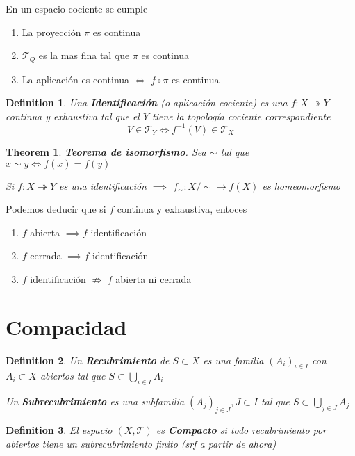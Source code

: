 \documentclass{myclass}
\newtheorem*{definition}{Definition}
\newtheorem*{theorem}{Theorem}
\begin{document}
En un espacio cociente se cumple
\begin{enumerate}[topsep=-6pt, itemsep=0pt]
  \item La proyección $\pi$ es continua
  \item $\mathcal{T}_{Q}$ es la mas fina tal que $\pi$ es continua
  \item La aplicación es continua $\iff$ $f\circ \pi$ es continua
\end{enumerate}

\begin{definition}
Una \textbf{Identificación} (o aplicación cociente) es una $f:X \twoheadrightarrow Y$ continua y exhaustiva tal que el $Y$ tiene la topología cociente correspondiente
\[
V\in \mathcal{T}_Y \iff f^{-1}(V) \in \mathcal{T}_X
\] 
\end{definition}

\begin{theorem}
\textbf{Teorema de isomorfismo}. Sea $\sim $ tal que $x\sim y \iff f(x)=f(y)$

Si $f:X \twoheadrightarrow Y$ es una identificación $\implies$ $f_\sim :X / \sim \to  f(X)$ es homeomorfismo
\end{theorem}

Podemos deducir que si $f$ continua y exhaustiva, entoces
\begin{enumerate}[topsep=-6pt, itemsep=0pt]
  \item $f$ abierta $\implies f$ identificación
  \item $f$ cerrada $\implies f$ identificación
  \item $f$ identificación  $\not\Rightarrow$ $f$ abierta ni cerrada
\end{enumerate}

\section{Compacidad}
\begin{definition}
Un \textbf{Recubrimiento} de $S\subset X$ es una familia $(A_i)_{i\in I}$ con $A_i \subset X$ abiertos tal que $S\subset \bigcup_{i\in I} A_i$ 

Un \textbf{Subrecubrimiento} es una subfamilia $(A_j)_{j\in J}, J\subset I$ tal que $S\subset \bigcup_{j\in J} A_j$ 
\end{definition}

\begin{definition}
El espacio $(X, \mathcal{T})$ es \textbf{Compacto} si todo recubrimiento por abiertos tiene un subrecubrimiento finito (srf a partir de ahora)
\end{definition}
\end{document}
